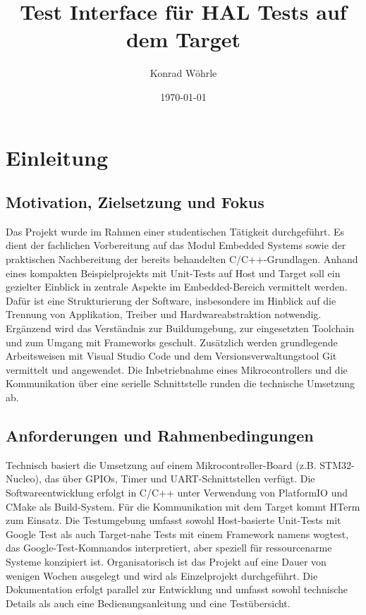 \documentclass[12pt,a4paper]{article}
\title{Test Interface für HAL Tests auf dem Target}
\author{Konrad Wöhrle}
\date{\today}
\begin{document}
\maketitle
\newpage

\tableofcontents
\newpage

\section{Einleitung}
\subsection{Motivation, Zielsetzung und Fokus}

Das Projekt wurde im Rahmen einer studentischen Tätigkeit durchgeführt.
Es dient der fachlichen Vorbereitung auf das Modul Embedded Systems sowie der praktischen Nachbereitung der bereits behandelten C/C++-Grundlagen.
\newline
Anhand eines kompakten Beispielprojekts mit Unit-Tests auf Host und Target soll ein gezielter Einblick in zentrale Aspekte im Embedded-Bereich vermittelt werden.
Dafür ist eine Strukturierung der Software, insbesondere im Hinblick auf die Trennung von Applikation, Treiber und Hardwareabstraktion notwendig.
Ergänzend wird das Verständnis zur Buildumgebung, zur eingesetzten Toolchain und zum Umgang mit Frameworks geschult.
Zusätzlich werden grundlegende Arbeitsweisen mit Visual Studio Code und dem Versionsverwaltungstool Git vermittelt und angewendet.
Die Inbetriebnahme eines Mikrocontrollers und die Kommunikation über eine serielle Schnittstelle runden die technische Umsetzung ab.

\subsection{Anforderungen und Rahmenbedingungen}
Technisch basiert die Umsetzung auf einem Mikrocontroller-Board (z.B. STM32-Nucleo), das über GPIOs, Timer und UART-Schnittstellen verfügt.
Die Softwareentwicklung erfolgt in C/C++ unter Verwendung von PlatformIO und CMake als Build-System.
Für die Kommunikation mit dem Target kommt HTerm zum Einsatz.
Die Testumgebung umfasst sowohl Host-basierte Unit-Tests mit Google Test als auch Target-nahe Tests mit einem  Framework namens wogtest,
das Google-Test-Kommandos interpretiert, aber speziell für ressourcenarme Systeme konzipiert ist.
\newline
Organisatorisch ist das Projekt auf eine Dauer von wenigen Wochen ausgelegt und wird als Einzelprojekt durchgeführt.
Die Dokumentation erfolgt parallel zur Entwicklung und umfasst sowohl technische Details als auch eine Bedienungsanleitung und eine Testübersicht.
\end{document}
